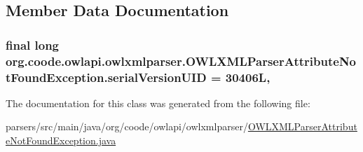 \subsection{Member Data Documentation}
\hypertarget{classorg_1_1coode_1_1owlapi_1_1owlxmlparser_1_1_o_w_l_x_m_l_parser_attribute_not_found_exception_a7fc75a7e28b77c3333d1b398f35f5704}{
\subsubsection[{serial\-Version\-U\-I\-D}]{\setlength{\rightskip}{0pt plus 5cm}final long org.\-coode.\-owlapi.\-owlxmlparser.\-O\-W\-L\-X\-M\-L\-Parser\-Attribute\-Not\-Found\-Exception.\-serial\-Version\-U\-I\-D = 30406\-L\hspace{0.3cm}{\ttfamily [static]}, {\ttfamily [private]}}}\label{classorg_1_1coode_1_1owlapi_1_1owlxmlparser_1_1_o_w_l_x_m_l_parser_attribute_not_found_exception_a7fc75a7e28b77c3333d1b398f35f5704}


The documentation for this class was generated from the following file\-:\begin{DoxyCompactItemize}
\item 
parsers/src/main/java/org/coode/owlapi/owlxmlparser/\hyperlink{_o_w_l_x_m_l_parser_attribute_not_found_exception_8java}{O\-W\-L\-X\-M\-L\-Parser\-Attribute\-Not\-Found\-Exception.\-java}\end{DoxyCompactItemize}
